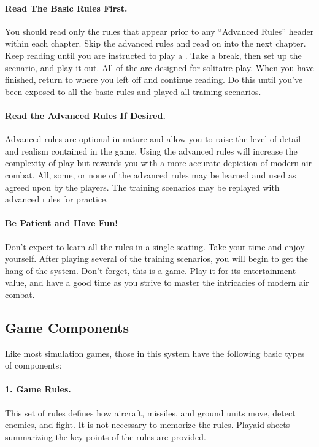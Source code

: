 \paragraph{Read The Basic Rules First.} You should read only the rules that appear prior to any “Advanced Rules” header within each chapter. Skip the advanced rules and read on into the next chapter. Keep reading until you are instructed to play a . Take a break, then set up the scenario, and play it out. All of the  are designed for solitaire play. When you have finished, return to where you left off and continue reading. Do this until you've been exposed to all the basic rules and played all training scenarios.

\paragraph{Read the Advanced Rules If Desired.} Advanced rules are optional in nature and allow you to raise the level of detail and realism contained in the game. Using the advanced rules will increase the complexity of play but rewards you with a more accurate depiction of modern air combat. All, some, or none of the advanced rules may be learned and used as agreed upon by the players. The training scenarios may be replayed with advanced rules for practice.

\paragraph{Be Patient and Have Fun!} Don't expect to learn all the rules in a single seating. Take your time and enjoy yourself. After playing several of the training scenarios, you will begin to get the hang of the system. Don't forget, this is a game. Play it for its entertainment value, and have a good time as you strive to master the intricacies of modern air combat.

\subsection{Game Components}

Like most simulation games, those in this system have the following basic types of components:

\paragraph{1. Game Rules.} This set of rules defines how aircraft, missiles, and ground units move, detect enemies, and fight. It is not necessary to memorize the rules. Play{\xhyphen}aid sheets summarizing the key points of the rules are provided.


